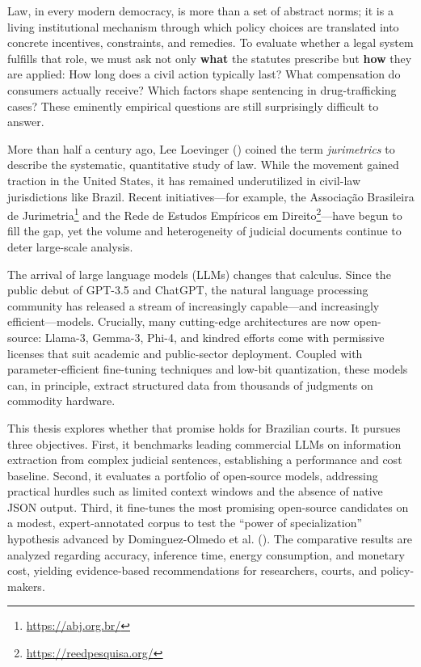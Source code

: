 \documentclass[
  12pt,
]{article}
\begin{document}
\vspace*{\fill}

Law, in every modern democracy, is more than a set of abstract norms; it
is a living institutional mechanism through which policy choices are
translated into concrete incentives, constraints, and remedies. To
evaluate whether a legal system fulfills that role, we must ask not only
\textbf{what} the statutes prescribe but \textbf{how} they are applied:
How long does a civil action typically last? What compensation do
consumers actually receive? Which factors shape sentencing in
drug-trafficking cases? These eminently empirical questions are still
surprisingly difficult to answer.

More than half a century ago, Lee Loevinger
() coined the term
\emph{jurimetrics} to describe the systematic, quantitative study of
law. While the movement gained traction in the United States, it has
remained underutilized in civil-law jurisdictions like Brazil. Recent
initiatives---for example, the Associação Brasileira de
Jurimetria\footnote{\url{https://abj.org.br/}} and the Rede de Estudos
Empíricos em Direito\footnote{\url{https://reedpesquisa.org/}}---have
begun to fill the gap, yet the volume and heterogeneity of judicial
documents continue to deter large-scale analysis.

The arrival of large language models (LLMs) changes that calculus. Since
the public debut of GPT-3.5 and ChatGPT, the natural language processing
community has released a stream of increasingly capable---and
increasingly efficient---models. Crucially, many cutting-edge
architectures are now open-source: Llama-3, Gemma-3, Phi-4, and kindred
efforts come with permissive licenses that suit academic and
public-sector deployment. Coupled with parameter-efficient fine-tuning
techniques and low-bit quantization, these models can, in principle,
extract structured data from thousands of judgments on commodity
hardware.

This thesis explores whether that promise holds for Brazilian courts. It
pursues three objectives. First, it benchmarks leading commercial LLMs
on information extraction from complex judicial sentences, establishing
a performance and cost baseline. Second, it evaluates a portfolio of
open-source models, addressing practical hurdles such as limited context
windows and the absence of native JSON output. Third, it fine-tunes the
most promising open-source candidates on a modest, expert-annotated
corpus to test the ``power of specialization'' hypothesis advanced by
Dominguez-Olmedo et al.
(). The comparative
results are analyzed regarding accuracy, inference time, energy
consumption, and monetary cost, yielding evidence-based recommendations
for researchers, courts, and policy-makers.
\end{document}
